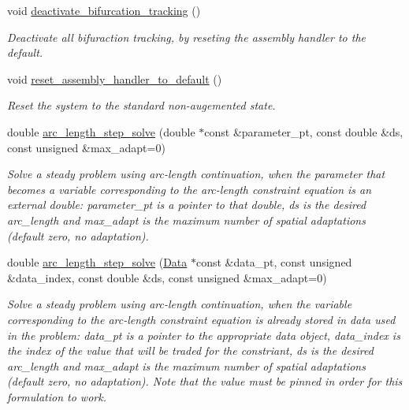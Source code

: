 \begin{DoxyCompactItemize}
void \hyperlink{classoomph_1_1Problem_ac5b47ae12ed6445e52c65596dfa97c6d}{deactivate\+\_\+bifurcation\+\_\+tracking} ()
\begin{DoxyCompactList}\small\item\em Deactivate all bifuraction tracking, by reseting the assembly handler to the default. \end{DoxyCompactList}\item 
void \hyperlink{classoomph_1_1Problem_aecb590c73e64b0a85f7bec0053e2c51d}{reset\+\_\+assembly\+\_\+handler\+\_\+to\+\_\+default} ()
\begin{DoxyCompactList}\small\item\em Reset the system to the standard non-\/augemented state. \end{DoxyCompactList}\item 
double \hyperlink{classoomph_1_1Problem_ad8414efbd8099d3e6cf3f4daea06cc8f}{arc\+\_\+length\+\_\+step\+\_\+solve} (double $\ast$const \&parameter\+\_\+pt, const double \&ds, const unsigned \&max\+\_\+adapt=0)
\begin{DoxyCompactList}\small\item\em Solve a steady problem using arc-\/length continuation, when the parameter that becomes a variable corresponding to the arc-\/length constraint equation is an external double\+: parameter\+\_\+pt is a pointer to that double, ds is the desired arc\+\_\+length and max\+\_\+adapt is the maximum number of spatial adaptations (default zero, no adaptation). \end{DoxyCompactList}\item 
double \hyperlink{classoomph_1_1Problem_aefb723728ed26abe410b61ec38d42688}{arc\+\_\+length\+\_\+step\+\_\+solve} (\hyperlink{classoomph_1_1Data}{Data} $\ast$const \&data\+\_\+pt, const unsigned \&data\+\_\+index, const double \&ds, const unsigned \&max\+\_\+adapt=0)
\begin{DoxyCompactList}\small\item\em Solve a steady problem using arc-\/length continuation, when the variable corresponding to the arc-\/length constraint equation is already stored in data used in the problem\+: data\+\_\+pt is a pointer to the appropriate data object, data\+\_\+index is the index of the value that will be traded for the constriant, ds is the desired arc\+\_\+length and max\+\_\+adapt is the maximum number of spatial adaptations (default zero, no adaptation). Note that the value must be pinned in order for this formulation to work. \end{DoxyCompactList}\item 

\end{DoxyCompactItemize}
